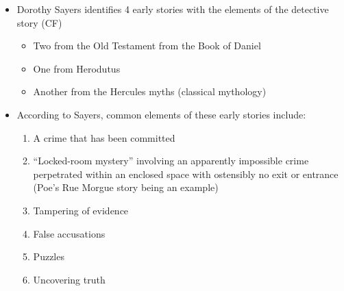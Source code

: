 \documentclass[a4paper,landscape,headrule,footrule,xetex]{foils}
\begin{document}
\begin{itemize}

  \item  Dorothy Sayers  identifies 4 early stories with the elements of the
    detective story (CF) 
    \begin{itemize}
    \item    Two from the Old Testament from the Book of
    Daniel
  \item     One from Herodutus   
  \item   Another from the Hercules myths
    (classical mythology)    
  \end{itemize}

\item According to Sayers, common elements of these early stories
  include: 
  \begin{enumerate}
  \item A crime that has been committed
  \item “Locked-room mystery” involving an apparently impossible crime
    perpetrated within an enclosed space with ostensibly no exit or
    entrance (Poe's   Rue Morgue   story being an example)
  \item Tampering of evidence
  \item False accusations
  \item Puzzles
  \item Uncovering truth 
  \end{enumerate}
\end{itemize}
\end{document}
